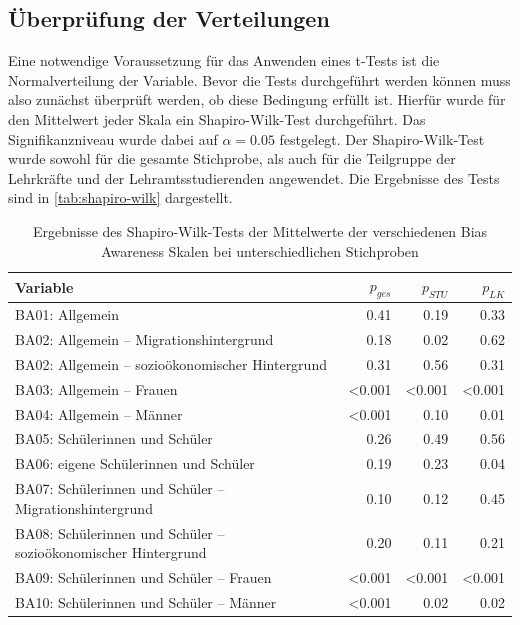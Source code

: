 \subsection{Überprüfung der Verteilungen}
\label{subsec:normalverteilung}

Eine notwendige Voraussetzung für das Anwenden eines t-Tests ist die Normalverteilung der Variable.
Bevor die Tests durchgeführt werden können muss also zunächst überprüft werden, ob diese Bedingung erfüllt ist.
Hierfür wurde für den Mittelwert jeder Skala ein Shapiro-Wilk-Test durchgeführt.
Das Signifikanzniveau wurde dabei auf $\alpha=0.05$ festgelegt.
Der Shapiro-Wilk-Test wurde sowohl für die gesamte Stichprobe, als auch für die Teilgruppe der Lehrkräfte und der Lehramtsstudierenden angewendet.
Die Ergebnisse des Tests sind in \autoref{tab:shapiro-wilk} dargestellt.

\begin{table}[h!]
	\begin{tabularx}{\textwidth}{X | r | r | r}
		\hline
		Variable & $p_{ges}$ & $p_{STU}$ & $p_{LK}$ \\
		\hline
		BA01: Allgemein & 0.41 & 0.19 & 0.33\\
		BA02: Allgemein -- Migrationshintergrund & 0.18 & 0.02 & 0.62\\
		BA02: Allgemein -- sozioökonomischer Hintergrund & 0.31 & 0.56 & 0.31\\
		BA03: Allgemein -- Frauen & <0.001 & <0.001 & <0.001\\
		BA04: Allgemein -- Männer & <0.001 & 0.10 & 0.01\\
		BA05: Schülerinnen und Schüler & 0.26 & 0.49 & 0.56\\
		BA06: eigene Schülerinnen und Schüler & 0.19 & 0.23 & 0.04\\
		BA07: Schülerinnen und Schüler -- Migrationshintergrund & 0.10 & 0.12 & 0.45\\
		BA08: Schülerinnen und Schüler -- sozioökonomischer Hintergrund & 0.20 & 0.11 & 0.21\\
		BA09: Schülerinnen und Schüler -- Frauen & <0.001 & <0.001 & <0.001\\
		BA10: Schülerinnen und Schüler -- Männer & <0.001 & 0.02 & 0.02\\
		\hline
	\end{tabularx}
	\caption{Ergebnisse des Shapiro-Wilk-Tests der Mittelwerte der verschiedenen Bias Awareness Skalen bei unterschiedlichen Stichproben}
	\label{tab:shapiro-wilk}
\end{table}

